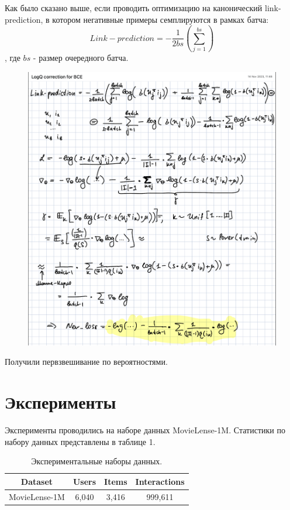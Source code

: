\documentclass{article}
\begin{document}
Как было сказано выше, если проводить оптимизацию на канонический link-prediction, в котором негативные примеры семплируются в рамках батча:
$$
Link-prediction = - \frac{1}{2 bs} (\sum_{j = 1}^{bs})
$$
, где $bs$ - размер очередного батча.
\begin{figure}[!ht]
    \centering
    \includegraphics[width=130mm]{images/logQcorrection.png}
\end{figure}

\newpage
Получили первзвешивание по вероятностями.
\section{Эксперименты}

Эксперименты проводились на наборе данных MovieLense-1M. Статистики по набору данных представлены в 
таблице 1.

\begin{table}[h]
    \centering
    \begin{tabular}{c|c|c|c}
        Dataset & Users & Items & Interactions\\
        \hline
        MovieLense-1M & 6,040 & 3,416 & 999,611 \\
    \end{tabular}
    \caption{Экспериментальные наборы данных.}
    \label{tab:my_label}
\end{table}
\end{document}
